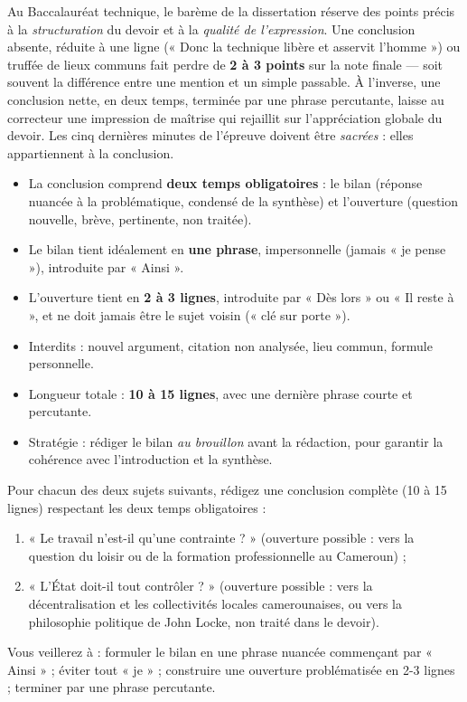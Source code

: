 \documentclass[11pt]{article}
\newcommand{\cle}[1]{{\popxbold\color{popdark}#1}}
\begin{document}
\begin{savaistu}
Au Baccalauréat technique, le barème de la dissertation réserve des points précis à la \emph{structuration} du devoir et à la \emph{qualité de l'expression}. Une conclusion absente, réduite à une ligne (« Donc la technique libère et asservit l'homme ») ou truffée de lieux communs fait perdre de \textbf{2 à 3 points} sur la note finale — soit souvent la différence entre une mention et un simple passable. À l'inverse, une conclusion nette, en deux temps, terminée par une phrase percutante, laisse au correcteur une impression de maîtrise qui rejaillit sur l'appréciation globale du devoir. Les cinq dernières minutes de l'épreuve doivent être \emph{sacrées} : elles appartiennent à la conclusion.
\end{savaistu}

\begin{aretenir}
\begin{itemize}
\item La conclusion comprend \textbf{deux temps obligatoires} : le \cle{bilan} (réponse nuancée à la problématique, condensé de la synthèse) et l'\cle{ouverture} (question nouvelle, brève, pertinente, non traitée).
\item Le bilan tient idéalement en \textbf{une phrase}, impersonnelle (jamais « je pense »), introduite par « Ainsi ».
\item L'ouverture tient en \textbf{2 à 3 lignes}, introduite par « Dès lors » ou « Il reste à », et ne doit jamais être le sujet voisin (« clé sur porte »).
\item Interdits : nouvel argument, citation non analysée, lieu commun, formule personnelle.
\item Longueur totale : \textbf{10 à 15 lignes}, avec une dernière phrase courte et percutante.
\item Stratégie : rédiger le bilan \emph{au brouillon} avant la rédaction, pour garantir la cohérence avec l'introduction et la synthèse.
\end{itemize}
\end{aretenir}

\begin{exercice}
Pour chacun des deux sujets suivants, rédigez une conclusion complète (10 à 15 lignes) respectant les deux temps obligatoires :
\begin{enumerate}
\item « Le travail n'est-il qu'une contrainte ? » (ouverture possible : vers la question du loisir ou de la formation professionnelle au Cameroun) ;
\item « L'État doit-il tout contrôler ? » (ouverture possible : vers la décentralisation et les collectivités locales camerounaises, ou vers la philosophie politique de John Locke, non traité dans le devoir).
\end{enumerate}
Vous veillerez à : formuler le bilan en une phrase nuancée commençant par « Ainsi » ; éviter tout « je » ; construire une ouverture problématisée en 2-3 lignes ; terminer par une phrase percutante.
\end{exercice}
\end{document}
